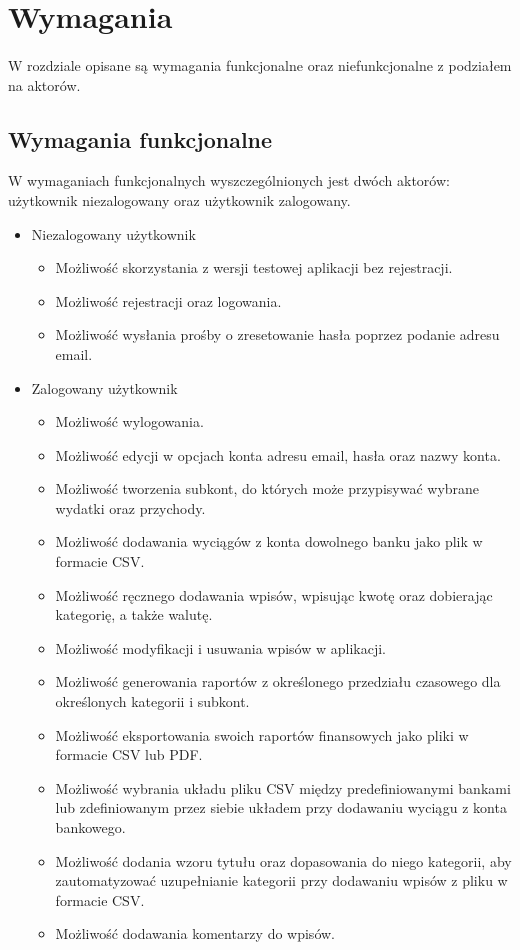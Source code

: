 \documentclass{article}
\begin{document}
	\section{Wymagania}
	\paragraph{} W rozdziale opisane są wymagania funkcjonalne oraz niefunkcjonalne z podziałem na aktorów.
	\subsection{Wymagania funkcjonalne}
	W wymaganiach funkcjonalnych wyszczególnionych jest dwóch aktorów: użytkownik niezalogowany oraz użytkownik zalogowany.
	\begin{itemize}
		\item Niezalogowany użytkownik
			\begin{itemize}
				\item Możliwość skorzystania z wersji testowej aplikacji bez rejestracji.
				\item Możliwość rejestracji oraz logowania.
				\item Możliwość wysłania prośby o zresetowanie hasła poprzez podanie adresu email.
			\end{itemize}

		\item Zalogowany użytkownik
			\begin{itemize}
				\item Możliwość wylogowania.
				\item Możliwość edycji w opcjach konta adresu email, hasła oraz nazwy konta.
				\item Możliwość tworzenia subkont, do których może przypisywać wybrane wydatki oraz przychody.
				\item Możliwość dodawania wyciągów z konta dowolnego banku jako plik w formacie CSV.
				\item Możliwość ręcznego dodawania wpisów, wpisując kwotę oraz dobierając kategorię, a także walutę.
				\item Możliwość modyfikacji i usuwania wpisów w aplikacji.
				\item Możliwość generowania raportów z określonego przedziału czasowego dla określonych kategorii i subkont.
				\item Możliwość eksportowania swoich raportów finansowych jako pliki w formacie CSV lub PDF.
				\item Możliwość wybrania układu pliku CSV między predefiniowanymi bankami lub zdefiniowanym przez siebie układem przy dodawaniu wyciągu z konta bankowego.
				\item Możliwość dodania wzoru tytułu oraz dopasowania do niego kategorii, aby zautomatyzować uzupełnianie kategorii przy dodawaniu wpisów z pliku w formacie CSV.
				\item Możliwość dodawania komentarzy do wpisów.
			\end{itemize}
	\end{itemize}
\end{document}
